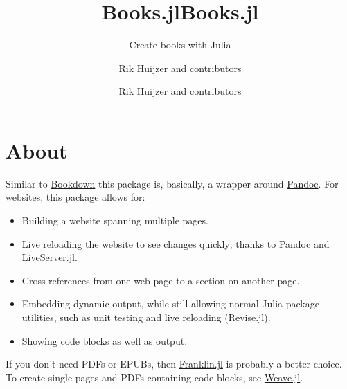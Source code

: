 \documentclass[
  14pt
  american,
  paper=a4,
  ,captions=tableheading
]{scrreprt}
\title{Books.jl}
\subtitle{Create books with Julia}
\author{Rik Huijzer and contributors}
\date{}
\title{Books.jl}
\author{Rik Huijzer and contributors}
\date{}
\providecommand{\tightlist}{%
  \setlength{\itemsep}{0pt}\setlength{\parskip}{0pt}}
\begin{document}
\begin{titlepage}
\newcommand{\colorRule}[3][black]{\textcolor[HTML]{#1}{\rule{#2}{#3}}}
\end{titlepage}
\restoregeometry




{
\setcounter{tocdepth}{2}
\tableofcontents
}
\hypertarget{sec:about}{%
\chapter{About}\label{sec:about}}

Similar to \href{https://bookdown.org}{Bookdown} this package is,
basically, a wrapper around \href{https://pandoc.org/}{Pandoc}. For
websites, this package allows for:

\begin{itemize}
\tightlist
\item
  Building a website spanning multiple pages.
\item
  Live reloading the website to see changes quickly; thanks to Pandoc
  and \href{https://github.com/tlienart/LiveServer.jl}{LiveServer.jl}.
\item
  Cross-references from one web page to a section on another page.
\item
  Embedding dynamic output, while still allowing normal Julia package
  utilities, such as unit testing and live reloading (Revise.jl).
\item
  Showing code blocks as well as output.
\end{itemize}

If you don't need PDFs or EPUBs, then
\href{https://github.com/tlienart/Franklin.jl}{Franklin.jl} is probably
a better choice. To create single pages and PDFs containing code blocks,
see \href{https://github.com/JunoLab/Weave.jl}{Weave.jl}.
\end{document}
